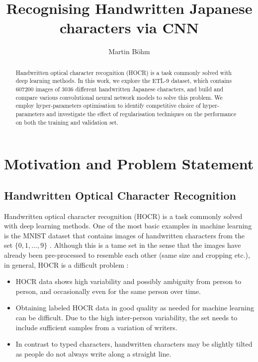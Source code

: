 \documentclass[british,12p]{article}
\title{Recognising Handwritten Japanese characters via CNN}
\author{Martin Böhm}
\begin{document}
	\maketitle
    \begin{abstract}
    	Handwritten optical character recognition (HOCR) is a task commonly solved with deep learning methods. In this work, we explore the ETL-9 dataset, which contains 607200 images of 3036 different handwritten Japanese characters, and build and compare various convolutional neural network models to solve this problem. We employ hyper-parameters optimisation to identify competitive choice of hyper-parameters and investigate the effect of regularisation techniques on the performance on both the training and validation set.  
    \end{abstract}
    
    \tableofcontents
    \newpage
    \section{Motivation and Problem Statement}
    \subsection{Handwritten Optical Character Recognition}\label{secHOCR}
    Handwritten optical character recognition (HOCR) is a task commonly solved with deep learning methods. One of the most basic examples in machine learning is the MNIST dataset that contains images of handwritten characters from the set $\{0, 1, \dots, 9\}$ \cite{deepai:19}. Although this is a tame set in the sense that the images have already been pre-processed \cite[p. 103]{buduma:17} to resemble each other (same size and cropping etc.), in general, HOCR is a difficult problem \cite{perwei:2014}:
    \begin{itemize}
    	\item HOCR data shows high variability and possibly ambiguity from person to person, and occasionally even for the same person over time.
    	\item Obtaining labeled HOCR data in good quality as needed for machine learning can be difficult. Due to the high inter-person variability, the set needs to include sufficient samples from a variation of writers.
    	\item In contrast to typed characters, handwritten characters may be slightly tilted as people do not always write along a straight line. 
    \end{itemize}
    
\end{document}
